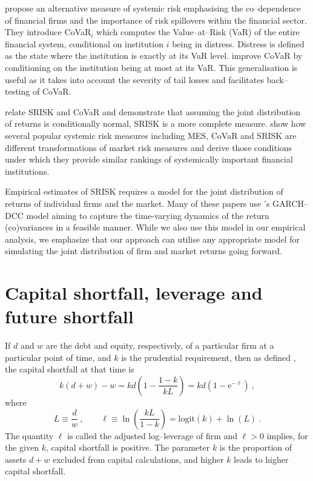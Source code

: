 \documentclass[authoryear]{elsarticle}
\newcommand{\logit}{\mathrm{logit}}
\newcommand{\e}{\mathrm{e}}
\newcommand{\cq}{\ , \qquad}
\newcommand{\be}[1]{\begin{equation}\label{#1}}
\newcommand{\ee}{\end{equation}}
\begin{document}
\cite{adrian2011covar} propose an alternative measure of systemic risk  emphasising the co--dependence of financial firms and the importance of risk spillovers within the financial sector. They introduce CoVaR$_i$ which computes the Value--at--Risk (VaR) of the entire financial system, conditional on institution $i$ being in distress. Distress is defined as the state where the institution is exactly at its VaR level. \cite{Girardi2013} improve CoVaR by conditioning on the institution being at most at its VaR. This generalisation is useful as it takes into account the severity of tail losses and facilitates back--testing of CoVaR. 

\cite{acharya2012aer} relate SRISK and CoVaR and demonstrate that assuming the joint distribution of returns is conditionally normal, SRISK is a more complete measure. \cite{Benoit2013} show how several popular systemic risk measures including MES, CoVaR and SRISK are different transformations of market risk measures and derive those conditions under which they provide similar rankings of systemically important financial institutions.

Empirical estimates of SRISK  requires a model for the joint distribution of returns of individual firms and the market. Many of these papers use \cite{engle2002dynamic}'s GARCH--DCC model aiming to capture the time-varying dynamics of the return (co)variances in a feasible manner. While we also use this model in our empirical analysis, we emphasize that our approach can utilise any appropriate model for simulating the joint distribution of firm and market returns going forward. 

\section{Capital shortfall, leverage and future shortfall}\label{capshort}

If $d$ and $w$ are the debt and equity, respectively, of a particular  firm at a particular point of time, and $k$ is the prudential requirement,  then  as defined \cite{brownlees2015}, the  capital shortfall at that time is
\be{shortfall}
k (d+w)-w = k d\left(1-\frac{1-k}{kL}\right)=kd\left(1-\e^{-\ell}\right)
\ ,
\ee
where
$$
L\equiv\frac{d}{w}\cq \ell\equiv\ln\left(\frac{kL}{1-k}\right) = \logit(k) + \ln(L) \ .
$$
The quantity $\ell$ is called the adjusted log--leverage of firm  and $\ell>0$ implies, for the given $k$, capital shortfall is positive. The parameter $k$ is the proportion of assets $d+w$ excluded from capital calculations, and higher $ k$ leads to higher capital shortfall.   
\end{document}
